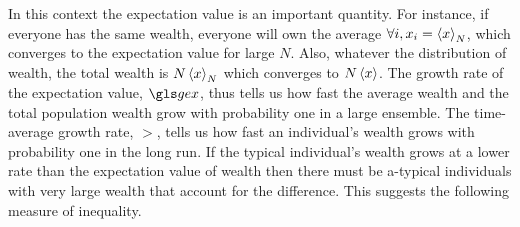 In this context the expectation value is an important quantity. 
For instance, if everyone has the same wealth, everyone will own the average $\forall i, x_i=\left\langle x \right\rangle_N$,
which converges to the expectation value for large $N$. Also, whatever the distribution 
of wealth, the total wealth is $N\left\langle x \right\rangle_N$ which converges to $N\left\langle x \right\rangle$. The growth 
rate of the expectation value, $\gex$, thus tells us how fast the average wealth and the 
total population wealth grow with probability one in a large ensemble. The time-average 
growth rate, $\gt$, tells us how fast an individual's wealth grows with probability one in 
the long run. If the typical individual's wealth grows at a lower rate than the 
expectation value of wealth then there must be a-typical individuals with very large 
wealth that account for the difference. This suggests the following measure of 
inequality.


